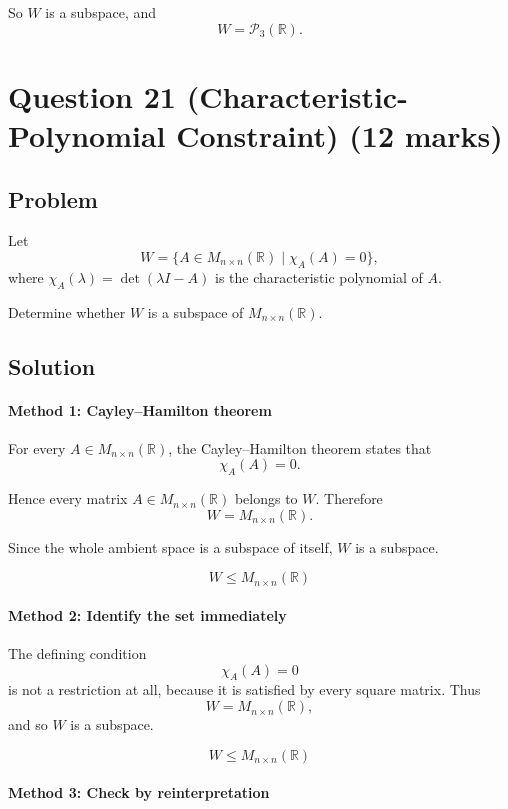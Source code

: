 \documentclass[12pt]{article}
\begin{document}
So \(W\) is a subspace, and
\[
\boxed{W=\mathcal P_3(\mathbb R)}.
\]

\newpage
\section{Question 21 (Characteristic-Polynomial Constraint) \hfill (12 marks)}
\subsection{Problem}

Let
\[
W=\{A\in M_{n\times n}(\mathbb R)\mid \chi_A(A)=0\},
\]
where \(\chi_A(\lambda)=\det(\lambda I-A)\) is the characteristic polynomial of \(A\).

Determine whether \(W\) is a subspace of \(M_{n\times n}(\mathbb R)\).

\subsection{Solution}

\paragraph{Method 1: Cayley--Hamilton theorem}

For every \(A\in M_{n\times n}(\mathbb R)\), the Cayley--Hamilton theorem states that
\[
\chi_A(A)=0.
\]

Hence every matrix \(A\in M_{n\times n}(\mathbb R)\) belongs to \(W\). Therefore
\[
W=M_{n\times n}(\mathbb R).
\]

Since the whole ambient space is a subspace of itself, \(W\) is a subspace.

\[
\boxed{W\le M_{n\times n}(\mathbb R)}
\]

\paragraph{Method 2: Identify the set immediately}

The defining condition
\[
\chi_A(A)=0
\]
is not a restriction at all, because it is satisfied by every square matrix. Thus
\[
W=M_{n\times n}(\mathbb R),
\]
and so \(W\) is a subspace.

\[
\boxed{W\le M_{n\times n}(\mathbb R)}
\]

\paragraph{Method 3: Check by reinterpretation}
\end{document}
